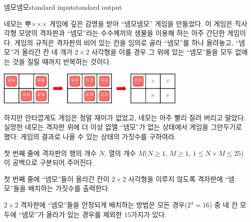 \begin{problem}{넴모넴모}{standard input}{standard output}

네모는 뿌××× 게임에 깊은 감명을 받아 ``넴모넴모'' 게임을 만들었다. 이 게임은 직사각형 모양의 격자판과 ``넴모''라는 수수께끼의 생물을 이용해 하는 아주 간단한 게임이다. 게임의 규칙은 격자판의 비어 있는 칸을 임의로 골라 ``넴모''를 하나 올려놓고, ``넴모''가 올라간 칸 네 개가 $2 \times 2$ 사각형을 이룰 경우 그 위에 있는 ``넴모''들을 모두 없애는 것을 질릴 때까지 반복하는 것이다.

\begin{center}
  \includegraphics[width=0.7\textwidth]{nemo.png}
\end{center}

하지만 안타깝게도 게임은 정말 재미가 없었고, 네모는 아주 빨리 질려 버리고 말았다. 실망한 네모는 격자판 위에 더 이상 없앨 ``넴모''가 없는 상태에서 게임을 그만두기로 했다. 게임의 결과로 나올 수 있는 상태의 가짓수를 구하여라.

\InputFile
첫 번째 줄에 격자판의 행의 개수 $N$, 열의 개수 $M$($N \ge 1$, $M \ge 1$, $1 \le N \times M \le 25$)이 공백으로 구분되어 주어진다.

\OutputFile
첫 번째 줄에 ``넴모''들이 올라간 칸이 $2 \times 2$ 사각형을 이루지 않도록 격자판에 ``넴모''들을 배치하는 가짓수를 출력한다.

\Example

\begin{example}
%
%
%
\end{example}

\Notes
$2 \times 2$ 격자판에 ``넴모''들을 안정되게 배치하는 방법은 모든 경우($2^{4}=16$) 중 네 칸 모두에 ``넴모''가 올라가 있는 경우를 제외한 $15$가지가 있다.

\end{problem}
